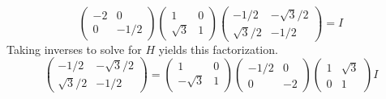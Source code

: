 \begin{ans}{2}
\begin{equation*}
            \begin{pmatrix}
              -2  &0    \\
               0  &-1/2
            \end{pmatrix}
            \begin{pmatrix}
               1         &0  \\
               \sqrt{3}  &1
            \end{pmatrix}
            \begin{pmatrix}
              -1/2        &-\sqrt{3}/2  \\
              \sqrt{3}/2  &-1/2
            \end{pmatrix}
            =I
          \end{equation*}
          Taking inverses to solve for $H$ yields this factorization.
          \begin{equation*}
            \begin{pmatrix}
              -1/2        &-\sqrt{3}/2  \\
              \sqrt{3}/2  &-1/2
            \end{pmatrix}
            =
            \begin{pmatrix}
                1         &0  \\
               -\sqrt{3}  &1
            \end{pmatrix}
            \begin{pmatrix}
              -1/2  &0    \\
               0    &-2
            \end{pmatrix}
            \begin{pmatrix}
              1  &\sqrt{3}  \\
              0  &1
            \end{pmatrix}
            I
          \end{equation*}
    
\end{ans}
